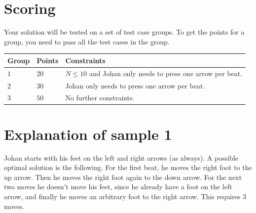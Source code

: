 \section*{Scoring}
Your solution will be tested on a set of test case groups.
To get the points for a group, you need to pass all the test cases in the group.

\noindent
\begin{tabular}{| l | l | p{10cm} |}
\hline
Group & Points & Constraints \\ \hline
  $1$    & $20$        & $N \le 10$ and Johan only needs to press one arrow per beat. \\ \hline 
  $2$    & $30$        & Johan only needs to press one arrow per beat. \\ \hline
  $3$    & $50$        & No further constraints. \\ \hline 
\end{tabular}

\section*{Explanation of sample 1}
Johan starts with his feet on the left and right arrows (as always).
A possible optimal solution is the following.
For the first beat, he moves the right foot to the up arrow.
Then he moves the right foot again to the down arrow.
For the next two moves he doesn't move his feet, since he already have a foot on the left arrow, and finally he moves an arbitrary foot to the right arrow.
This requires $3$ moves.
